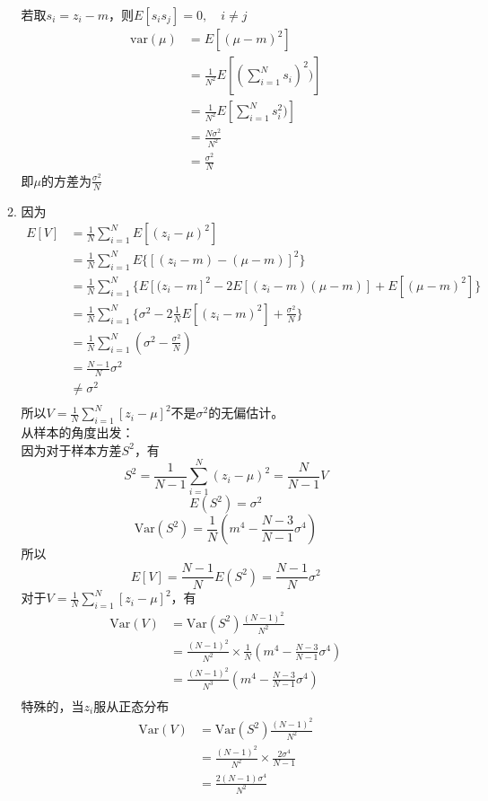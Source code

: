 \documentclass{article}
\begin{document}
\begin{enumerate}[1.]
\begin{enumerate}[(1)]
若取$s_i=z_i-m$，则$E[s_is_j]=0,\quad i \ne j$
$$
\begin{aligned}
\text{var}(\mu)
&=E[(\mu-m)^2]\\
&=\frac{1}{N^2}E[(\sum_{i=1}^Ns_i)^2)]\\
&=\frac{1}{N^2}E[\sum_{i=1}^Ns_i^2)]\\
&=\frac{N\sigma^2}{N^2}\\
&=\frac{\sigma^2}{N}
\end{aligned}
$$
即$\mu$的方差为$\frac{\sigma^2}{N}$\\
\item
因为
$$
\begin{aligned}
E[V]
&=\frac{1}{N}\sum_{i=1}^NE[(z_i-\mu)^2]\\
&=\frac{1}{N}\sum_{i=1}^NE\{[(z_i-m)-(\mu-m)]^2\}\\
&=\frac{1}{N}\sum_{i=1}^N\{E[(z_i-m]^2 -2E[(z_i-m)(\mu-m)] +E[(\mu-m)^2]\}\\
&=\frac{1}{N}\sum_{i=1}^N\{\sigma^2-2\frac{1}{N}E[(z_i-m)^2]+\frac{\sigma^2}{N}\}\\
&=\frac{1}{N}\sum_{i=1}^N(\sigma^2-\frac{\sigma^2}{N})\\
&=\frac{N-1}{N}\sigma^2\\
&\ne \sigma^2\\
\end{aligned}
$$
所以$V=\frac{1}{N}\sum_{i=1}^N[z_i-\mu]^2$不是$\sigma^2$的无偏估计。\\

从样本的角度出发：\\
因为对于样本方差$S^2$，有$$S^2=\frac{1}{N-1}\sum_{i=1}^N(z_i-\mu)^2=\frac{N}{N-1}V$$
$$E(S^2)=\sigma^2$$
$$\text{Var}(S^2)=\frac{1}{N}\left( m^4-\frac{N-3}{N-1}\sigma^4\right)$$
所以$$E[V]=\frac{N-1}{N}E(S^2)=\frac{N-1}{N}\sigma^2$$
对于$V=\frac{1}{N}\sum_{i=1}^N[z_i-\mu]^2$，有
$$
\begin{aligned}
\text{Var}(V)
&=\text{Var}(S^2) \frac{(N-1)^2}{N^2}\\
&=\frac{(N-1)^2}{N^2} \times \frac{1}{N}\left( m^4-\frac{N-3}{N-1}\sigma^4\right) \\
&=\frac{(N-1)^2}{N^3}\left( m^4-\frac{N-3}{N-1}\sigma^4\right) \\
\end{aligned}
$$
特殊的，当$z_i$服从正态分布
$$
\begin{aligned}
\text{Var}(V)
&=\text{Var}(S^2) \frac{(N-1)^2}{N^2}\\
&=\frac{(N-1)^2}{N^2} \times \frac{2\sigma^4}{N-1} \\
&=\frac{2(N-1)\sigma^4}{N^2}\\
\end{aligned}
$$
\end{enumerate}


\end{enumerate}
\end{document}

